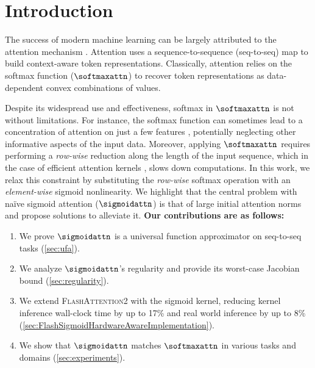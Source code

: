 \section{Introduction}
\label{sec:intro}

The success of modern machine learning can be largely attributed to the attention mechanism \citep{DBLP:journals/corr/BahdanauCB14,DBLP:conf/nips/VaswaniSPUJGKP17}. Attention uses a sequence-to-sequence (seq-to-seq) map to build context-aware token representations.
Classically, attention relies on the softmax function ($\softmaxattn$) to recover token representations as data-dependent convex combinations of values.

Despite its widespread use and effectiveness, softmax in $\softmaxattn$ is not without limitations. For instance, the softmax function can sometimes lead to a concentration of attention on just a few features \citep{DBLP:conf/iclr/YangDSC18,DBLP:conf/icml/GaneaGBS19}, potentially neglecting other informative aspects of the input data. Moreover, applying $\softmaxattn$ requires performing a \textit{row-wise} reduction along the length of the input sequence, which in the case of efficient attention kernels \citep{DBLP:conf/nips/DaoFERR22,DBLP:journals/corr/abs-2307-08691}, slows down computations.
In this work, we relax this constraint by substituting the \textit{row-wise} softmax operation with an \textit{element-wise} sigmoid nonlinearity. We highlight that the central problem with na\"ive sigmoid attention ($\sigmoidattn$) is that of large initial attention norms and propose solutions to alleviate it. \textbf{Our contributions are as follows:}



\begin{enumerate}[itemsep=0pt,leftmargin=*]
    \item We prove $\sigmoidattn$ is a universal function approximator on seq-to-seq tasks (\cref{sec:ufa}).
    \item We analyze $\sigmoidattn$'s regularity and provide its worst-case Jacobian bound (\cref{sec:regularity}).
    \item We extend \textsc{FlashAttention2} \citep{DBLP:conf/nips/DaoFERR22,DBLP:journals/corr/abs-2307-08691} with the sigmoid kernel, reducing kernel inference wall-clock time by up to 17\% and real world inference by up to 8\% (\cref{sec:FlashSigmoidHardwareAwareImplementation}).
    \item We show that $\sigmoidattn$ matches $\softmaxattn$ in various tasks and domains (\cref{sec:experiments}).
\end{enumerate}
